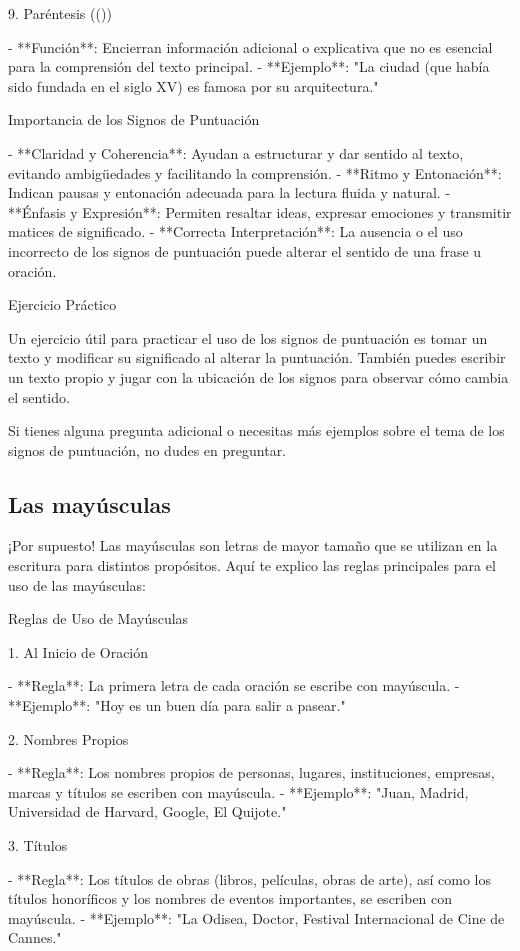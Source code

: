  9. Paréntesis (())

- **Función**: Encierran información adicional o explicativa que no es esencial para la comprensión del texto principal.
- **Ejemplo**: "La ciudad (que había sido fundada en el siglo XV) es famosa por su arquitectura."

 Importancia de los Signos de Puntuación

- **Claridad y Coherencia**: Ayudan a estructurar y dar sentido al texto, evitando ambigüedades y facilitando la comprensión.
- **Ritmo y Entonación**: Indican pausas y entonación adecuada para la lectura fluida y natural.
- **Énfasis y Expresión**: Permiten resaltar ideas, expresar emociones y transmitir matices de significado.
- **Correcta Interpretación**: La ausencia o el uso incorrecto de los signos de puntuación puede alterar el sentido de una frase u oración.

 Ejercicio Práctico

Un ejercicio útil para practicar el uso de los signos de puntuación es tomar un texto y modificar su significado al alterar la puntuación. También puedes escribir un texto propio y jugar con la ubicación de los signos para observar cómo cambia el sentido.

Si tienes alguna pregunta adicional o necesitas más ejemplos sobre el tema de los signos de puntuación, no dudes en preguntar.

\subsection{Las mayúsculas}

¡Por supuesto! Las mayúsculas son letras de mayor tamaño que se utilizan en la escritura para distintos propósitos. Aquí te explico las reglas principales para el uso de las mayúsculas:

 Reglas de Uso de Mayúsculas

 1. Al Inicio de Oración

- **Regla**: La primera letra de cada oración se escribe con mayúscula.
- **Ejemplo**: "Hoy es un buen día para salir a pasear."

 2. Nombres Propios

- **Regla**: Los nombres propios de personas, lugares, instituciones, empresas, marcas y títulos se escriben con mayúscula.
- **Ejemplo**: "Juan, Madrid, Universidad de Harvard, Google, El Quijote."

 3. Títulos

- **Regla**: Los títulos de obras (libros, películas, obras de arte), así como los títulos honoríficos y los nombres de eventos importantes, se escriben con mayúscula.
- **Ejemplo**: "La Odisea, Doctor, Festival Internacional de Cine de Cannes."

